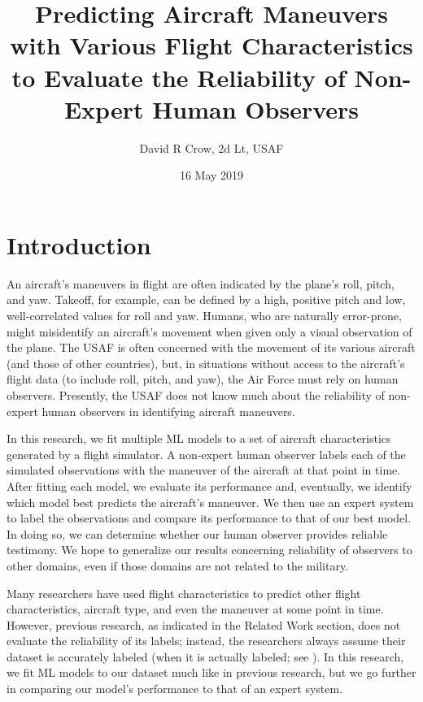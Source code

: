 \documentclass[11pt]{article}
\title{Predicting Aircraft Maneuvers with Various Flight Characteristics to Evaluate the Reliability of Non-Expert Human Observers}
\author{David R Crow, 2d Lt, USAF}
\date{16 May 2019}
\begin{document}
\frenchspacing
\maketitle

\section{Introduction}

An aircraft's maneuvers in flight are often indicated by the plane's roll, pitch, and yaw. Takeoff, for example, can be defined by a high, positive pitch and low, well-correlated values for roll and yaw. Humans, who are naturally error-prone, might misidentify an aircraft's movement when given only a visual observation of the plane. The \ac{USAF} is often concerned with the movement of its various aircraft (and those of other countries), but, in situations without access to the aircraft's flight data (to include roll, pitch, and yaw), the Air Force must rely on human observers. Presently, the \ac{USAF} does not know much about the reliability of non-expert human observers in identifying aircraft maneuvers.


In this research, we fit multiple \ac{ML} models to a set of aircraft characteristics generated by a flight simulator. A non-expert human observer labels each of the simulated observations with the maneuver of the aircraft at that point in time. After fitting each model, we evaluate its performance and, eventually, we identify which model best predicts the aircraft's maneuver. We then use an expert system to label the observations and compare its performance to that of our best model. In doing so, we can determine whether our human observer provides reliable testimony. We hope to generalize our results concerning reliability of observers to other domains, even if those domains are not related to the military.


Many researchers have used flight characteristics to predict other flight characteristics, aircraft type, and even the maneuver at some point in time. However, previous research, as indicated in the Related Work section, does not evaluate the reliability of its labels; instead, the researchers always assume their dataset is accurately labeled (when it is actually labeled; see \cite{Rodin1992}). In this research, we fit \ac{ML} models to our dataset much like in previous research, but we go further in comparing our model's performance to that of an expert system.
\end{document}
